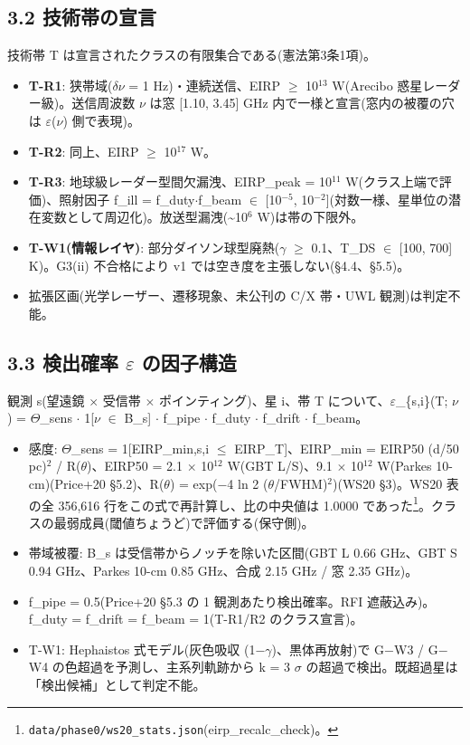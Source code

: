 \documentclass[11pt]{article}
\begin{document}
\subsection*{3.2 技術帯の宣言}
\noindent 技術帯 T は宣言されたクラスの有限集合である(憲法第3条1項)。\par\smallskip
\begin{itemize}\setlength{\itemsep}{1pt}
\item \textbf{T-R1}: 狭帯域(\(\delta\)\(\nu\) = 1 Hz)・連続送信、EIRP \(\geq\) 10\(^{13}\) W(Arecibo 惑星レーダー級)。送信周波数 \(\nu\) は窓 [1.10, 3.45] GHz 内で一様と宣言(窓内の被覆の穴は \(\varepsilon\)(\(\nu\)) 側で表現)。
\item \textbf{T-R2}: 同上、EIRP \(\geq\) 10\(^{17}\) W。
\item \textbf{T-R3}: 地球級レーダー型間欠漏洩、EIRP\_peak = 10\(^{11}\) W(クラス上端で評価)、照射因子 f\_ill = f\_duty\(\cdot\)f\_beam \(\in\) [10\(^{-5}\), 10\(^{-2}\)](対数一様、星単位の潜在変数として周辺化)。放送型漏洩(\textasciitilde{}10\(^{6}\) W)は帯の下限外。
\item \textbf{T-W1(情報レイヤ)}: 部分ダイソン球型廃熱(\(\gamma\) \(\geq\) 0.1、T\_DS \(\in\) [100, 700] K)。G3(ii) 不合格により v1 では空き度を主張しない(\S{}4.4、\S{}5.5)。
\item 拡張区画(光学レーザー、遷移現象、未公刊の C/X 帯・UWL 観測)は判定不能。
\end{itemize}

\subsection*{3.3 検出確率 \(\varepsilon\) の因子構造}
\noindent 観測 s(望遠鏡 \(\times\) 受信帯 \(\times\) ポインティング)、星 i、帯 T について、\(\varepsilon\)\_\{s,i\}(T; \(\nu\)) = \(\Theta\)\_sens \(\cdot\) 1[\(\nu\) \(\in\) B\_s] \(\cdot\) f\_pipe \(\cdot\) f\_duty \(\cdot\) f\_drift \(\cdot\) f\_beam。\par\smallskip
\begin{itemize}\setlength{\itemsep}{1pt}
\item 感度: \(\Theta\)\_sens = 1[EIRP\_min,s,i \(\leq\) EIRP\_T]、EIRP\_min = EIRP50 (d/50 pc)\(^{2}\) / R(\(\theta\))、EIRP50 = 2.1 \(\times\) 10\(^{12}\) W(GBT L/S)、9.1 \(\times\) 10\(^{12}\) W(Parkes 10-cm)(Price+20 \S{}5.2)、R(\(\theta\)) = exp(\(-\)4 ln 2 (\(\theta\)/FWHM)\(^{2}\))(WS20 \S{}3)。WS20 表の全 356,616 行をこの式で再計算し、比の中央値は 1.0000 であった\footnote{\texttt{data/phase0/ws20\_stats.json}(eirp\_recalc\_check)。}。クラスの最弱成員(閾値ちょうど)で評価する(保守側)。
\item 帯域被覆: B\_s は受信帯からノッチを除いた区間(GBT L 0.66 GHz、GBT S 0.94 GHz、Parkes 10-cm 0.85 GHz、合成 2.15 GHz / 窓 2.35 GHz)。
\item f\_pipe = 0.5(Price+20 \S{}5.3 の 1 観測あたり検出確率。RFI 遮蔽込み)。f\_duty = f\_drift = f\_beam = 1(T-R1/R2 のクラス宣言)。
\item T-W1: Hephaistos 式モデル(灰色吸収 (1\(-\)\(\gamma\))、黒体再放射)で G\(-\)W3 / G\(-\)W4 の色超過を予測し、主系列軌跡から k = 3 \(\sigma\) の超過で検出。既超過星は「検出候補」として判定不能。
\end{itemize}
\end{document}
